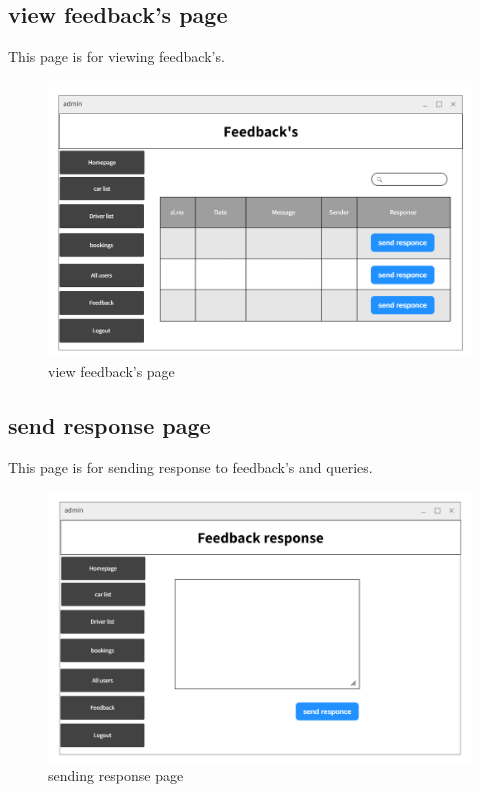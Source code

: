 \documentclass[a4paper,12pt,toc=flat]{report}
\begin{document}
	\pagebreak
	
	
		\subsection{ view feedback's page}
\hspace*{12pt}
	This page is for viewing feedback's.
	\begin{figure}[bph]
	\begin{center}
		\includegraphics[width=1.1 \linewidth, height=0.7\textheight]{"admin_feedback.png"}
	\end{center}
		\caption{ view feedback's page}
	\end{figure}

	\pagebreak
	
	
	
		\subsection{ send response page}
\hspace*{12pt}
	This page is for sending response to feedback's and queries.
	\begin{figure}[bph]
	\begin{center}
		\includegraphics[width=1.1 \linewidth, height=0.7\textheight]{"admin_response.png"}
	\end{center}
		\caption{ sending response page}
	\end{figure}
\end{document}
